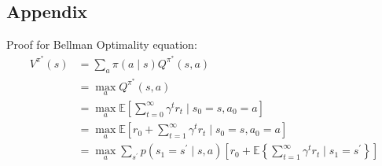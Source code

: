 \documentclass[11pt]{article}
\begin{document}
\subsection{Appendix}
Proof for Bellman Optimality equation:
\begin{equation}
\begin{aligned}
V^{\pi^{*}}(s) &=\sum_{a} \pi(a \mid s) Q^{\pi^{*}}(s, a) \\
&=\max _{a} Q^{\pi^{*}}(s, a) \\
&=\max _{a} \mathbb{E}\left[\sum_{t=0}^{\infty} \gamma^{t} r_{t} \mid s_{0}=s, a_{0}=a\right] \\
&=\max _{a} \mathbb{E}\left[r_{0}+\sum_{t=1}^{\infty} \gamma^{t} r_{t} \mid s_{0}=s, a_{0}=a\right] \\
&=\max _{a} \sum_{s^{\prime}} p\left(s_{1}=s^{\prime} \mid s, a\right)\left[r_{0}+\mathbb{E}\left\{\sum_{t=1}^{\infty} \gamma^{t} r_{t} \mid s_{1}=s^{\prime}\right\}\right]
\end{aligned}
\end{equation}
\end{document}
